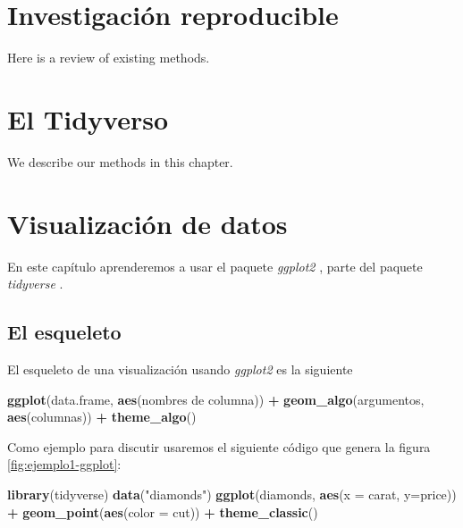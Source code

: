 \documentclass[]{book}
\newenvironment{Shaded}{\begin{snugshade}}{\end{snugshade}}
\newcommand{\DataTypeTok}[1]{\textcolor[rgb]{0.13,0.29,0.53}{#1}}
\newcommand{\KeywordTok}[1]{\textcolor[rgb]{0.13,0.29,0.53}{\textbf{#1}}}
\newcommand{\NormalTok}[1]{#1}
\newcommand{\OperatorTok}[1]{\textcolor[rgb]{0.81,0.36,0.00}{\textbf{#1}}}
\newcommand{\StringTok}[1]{\textcolor[rgb]{0.31,0.60,0.02}{#1}}
\begin{document}
\hypertarget{reproducible}{%
\chapter{Investigación reproducible}\label{reproducible}}

Here is a review of existing methods.

\hypertarget{tidyverso}{%
\chapter{El Tidyverso}\label{tidyverso}}

We describe our methods in this chapter.

\hypertarget{visualizacion}{%
\chapter{Visualización de datos}\label{visualizacion}}

En este capítulo aprenderemos a usar el paquete \emph{ggplot2}
\citep{Wickhamggplot}, parte del paquete \emph{tidyverse}
\citep{Wickhamtidyverse}.

\hypertarget{el-esqueleto}{%
\section{El esqueleto}\label{el-esqueleto}}

El esqueleto de una visualización usando \emph{ggplot2} es la siguiente

\begin{Shaded}
\begin{Highlighting}[]
\KeywordTok{ggplot}\NormalTok{(data.frame, }\KeywordTok{aes}\NormalTok{(nombres de columna)) }\OperatorTok{+}\StringTok{ }\KeywordTok{geom_algo}\NormalTok{(argumentos, }\KeywordTok{aes}\NormalTok{(columnas)) }\OperatorTok{+}\StringTok{ }\KeywordTok{theme_algo}\NormalTok{()}
\end{Highlighting}
\end{Shaded}

Como ejemplo para discutir usaremos el siguiente código que genera la
figura \ref{fig:ejemplo1-ggplot}:

\begin{Shaded}
\begin{Highlighting}[]
\KeywordTok{library}\NormalTok{(tidyverse)}
\KeywordTok{data}\NormalTok{(}\StringTok{"diamonds"}\NormalTok{)}
\KeywordTok{ggplot}\NormalTok{(diamonds, }\KeywordTok{aes}\NormalTok{(}\DataTypeTok{x =}\NormalTok{ carat, }\DataTypeTok{y=}\NormalTok{price)) }\OperatorTok{+}\StringTok{ }\KeywordTok{geom_point}\NormalTok{(}\KeywordTok{aes}\NormalTok{(}\DataTypeTok{color =}\NormalTok{ cut)) }\OperatorTok{+}\StringTok{ }\KeywordTok{theme_classic}\NormalTok{()}
\end{Highlighting}
\end{Shaded}
\end{document}
